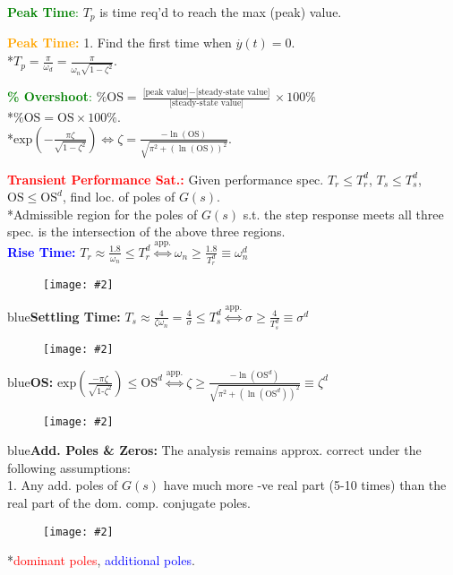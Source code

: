 \documentclass[5pt]{extarticle} %
\newcommand{\customFigure}[3][]{%
    \vspace{-1.5em}
    \begin{figure}[H]
        \centering
        \texttt{[image: \#2]}
    \end{figure}
    \vspace{-1.5em}
}
\begin{document}
\begin{paracol}{3}
{    \textcolor{green}{\textbf{Peak Time}:} $T_p$ is time req'd to reach the max (peak) value.

    \textcolor{orange}{\textbf{Peak Time:}} 1. Find the first time when $\overset{\cdot}{y}(t) = 0$. \\
    *$\boxed{T_p = \frac{\pi}{\omega_d} = \frac{\pi}{\omega_n \sqrt{1 - \zeta^2}}}$.

    \textcolor{green}{\textbf{\% Overshoot}:} $\% \text{OS} = \frac{\text{[peak value]} - \text{[steady-state value]}}{\text{[steady-state value]}} \times 100\%$ \\
    *$\text{\% OS} = \text{OS} \times 100 \%$. \\
    *$\boxed{\text{exp}\left(-\frac{\pi \zeta}{\sqrt{1-\zeta^2}}\right) \iff \zeta = \frac{-\ln(\text{OS})}{\sqrt{\pi^2 + (\ln(\text{OS}))^2}}}$.

    \textcolor{red}{\textbf{Transient Performance Sat.:}} Given performance spec. $T_r \leq T_r^d$, $T_s \leq T_s^d$, $\text{OS} \leq \text{OS}^d$, find loc. of poles of $G(s)$. \\
    *Admissible region for the poles of $G(s)$ s.t. the step response meets all three spec. is the intersection of the above three regions. \\
    \textcolor{blue}{\textbf{Rise Time:}} $T_r \approx \frac{1.8}{\omega_n} \leq T_r^d \overset{\text{app.}}{\iff} \omega_n \geq \frac{1.8}{T_r^d} \equiv \omega_n^d$ 

    \customFigure[0.1]{../Images/L12_0.png}

    \textcolor{blue}{\textbf{Settling Time:}} $T_s \approx \frac{4}{\zeta \omega_n} = \frac{4}{\sigma} \leq T_s^d \overset{\text{app.}}{\iff} \sigma \geq \frac{4}{T_s^d} \equiv \sigma^d$ 
    \customFigure[0.1]{../Images/L12_1.png}

    \textcolor{blue}{\textbf{OS:}} $\text{exp}\left(\frac{-\pi \zeta}{\sqrt{1\text{-}\zeta^2}}\right) \leq \text{OS}^d \overset{\text{app.}}{\iff} \zeta \geq \frac{-\ln(\text{OS}^d)}{\sqrt{\pi^2 + (\ln(\text{OS}^d))^2}} \equiv \zeta^d$ 
    \customFigure[0.1]{../Images/L12_2.png}

    \textcolor{blue}{\textbf{Add. Poles \& Zeros:}} The analysis remains approx. correct under the following assumptions: \\
    1. Any add. poles of $G(s)$ have much more -ve real part (5-10 times) than the real part of the dom. comp. conjugate poles. 
    \customFigure[0.2]{../Images/L12_3.png} \\
    *\textcolor{red}{dominant poles}, \textcolor{blue}{additional poles}.

}
\end{paracol}
\end{document}
